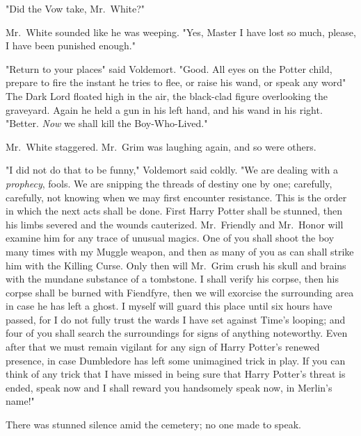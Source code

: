 "Did the Vow take, Mr.~White?"

Mr.~White sounded like he was weeping. "Yes, Master{\el} I have lost so
much, please, I have been punished enough."

"Return to your places{\el}" said Voldemort. "Good. All eyes on the Potter
child, prepare to fire the instant he tries to flee, or raise his wand, or
speak any word{\el}" The Dark Lord floated high in the air, the black-clad
figure overlooking the graveyard. Again he held a gun in his left hand, and his
wand in his right. "Better. \emph{Now} we shall kill the Boy-Who-Lived."

Mr.~White staggered. Mr.~Grim was laughing again, and so were others.

"I did not do that to be funny," Voldemort said coldly. "We are dealing with a
\emph{prophecy}, fools. We are snipping the threads of destiny one by one;
carefully, carefully, not knowing when we may first encounter resistance. This
is the order in which the next acts shall be done. First Harry Potter shall be
stunned, then his limbs severed and the wounds cauterized. Mr.~Friendly and
Mr.~Honor will examine him for any trace of unusual magics. One of you shall
shoot the boy many times with my Muggle weapon, and then as many of you as can
shall strike him with the Killing Curse. Only then will Mr.~Grim crush his
skull and brains with the mundane substance of a tombstone. I shall verify his
corpse, then his corpse shall be burned with Fiendfyre, then we will exorcise
the surrounding area in case he has left a ghost. I myself will guard this
place until six hours have passed, for I do not fully trust the wards I have
set against Time's looping; and four of you shall search the surroundings for
signs of anything noteworthy. Even after that we must remain vigilant for any
sign of Harry Potter's renewed presence, in case Dumbledore has left some
unimagined trick in play. If you can think of any trick that I have missed in
being sure that Harry Potter's threat is ended, speak now and I shall reward
you handsomely{\el} speak now, in Merlin's name!"

There was stunned silence amid the cemetery; no one made to speak.


